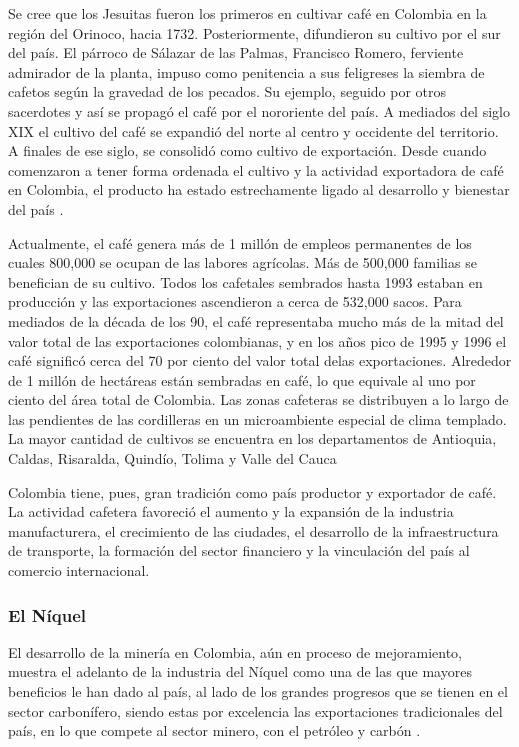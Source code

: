Se cree que los Jesuitas fueron los primeros en cultivar café en Colombia en la región del Orinoco, hacia 1732. Posteriormente, difundieron su cultivo por el sur del país. El párroco de Sálazar de las Palmas, Francisco Romero, ferviente admirador de la planta, impuso como penitencia a sus feligreses la siembra de cafetos según la gravedad de los pecados. Su ejemplo, seguido por otros sacerdotes y así se propagó el café por el nororiente del país. A mediados del siglo XIX el cultivo del café se expandió del norte al centro y occidente del territorio. A finales de ese siglo, se consolidó como cultivo de exportación. Desde cuando comenzaron a tener forma ordenada el cultivo y la actividad exportadora de café en Colombia, el producto ha estado estrechamente ligado al desarrollo y bienestar del país \cite{cafeMain}.

Actualmente, el café genera más de 1 millón de empleos permanentes de los cuales 800,000 se ocupan de las labores agrícolas. Más de 500,000 familias se benefician de su cultivo. Todos los cafetales sembrados hasta 1993 estaban en producción y las exportaciones ascendieron a cerca de 532,000 sacos. Para mediados de la década de los 90, el café representaba mucho más de la mitad del valor total de las exportaciones colombianas, y en los años pico de 1995 y 1996 el café significó cerca del 70 por ciento del valor total delas exportaciones. Alrededor de 1 millón de hectáreas están sembradas en café, lo que equivale al uno por ciento del área total de Colombia. Las zonas cafeteras se distribuyen a lo largo de las pendientes de las cordilleras en un microambiente especial de clima templado. La mayor cantidad de cultivos se encuentra en los departamentos de Antioquia, Caldas, Risaralda, Quindío, Tolima y Valle del Cauca \cite{cafeMain}

Colombia tiene, pues, gran tradición como país productor y exportador de café. La actividad cafetera favoreció el aumento y la expansión de la industria manufacturera, el crecimiento de las ciudades, el desarrollo de la infraestructura de transporte, la formación del sector financiero y la vinculación del país al comercio internacional.

\subsubsection{El Níquel}
El  desarrollo  de  la  minería  en  Colombia, aún en proceso de mejoramiento, muestra el adelanto de la industria del Níquel como una de las que mayores beneficios le han dado  al  país,  al  lado  de  los  grandes  progresos que se tienen en el sector carbonífero, siendo estas por excelencia las exportaciones tradicionales del país, en lo que compete al sector minero, con el petróleo y carbón \cite{niquelMain}.

